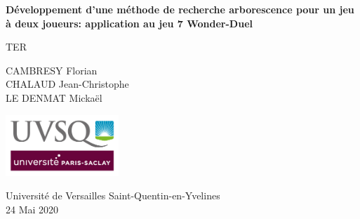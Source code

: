 \begin{titlepage}
    \begin{center}
        \vspace*{1cm}

        \Huge
        \textbf{Développement d'une méthode de recherche arborescence pour un jeu à deux joueurs:
            application au jeu 7 Wonder-Duel}

        \vspace{0.4cm}
        \LARGE
        TER

        \vspace{1.6cm}

        \large
        CAMBRESY Florian \\
        CHALAUD Jean-Christophe \\
        LE DENMAT Mickaël \\

        \vfill
        
        \vspace{0.8cm}
        \includegraphics[width=0.32\textwidth]{images/USVQ-logo.png}

        \vspace{0.4cm}

        \Large
        Université de Versailles Saint-Quentin-en-Yvelines \\
        \vspace{0.4cm}
        24 Mai 2020
    \end{center}
\end{titlepage}